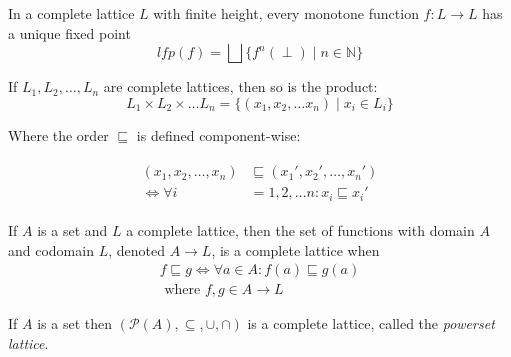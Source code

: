 

\begin{theorem}\label{thm:kleene_finite}
In a complete lattice $L$ with finite height, every monotone function $f : L \rightarrow L$ has a unique fixed point
\begin{equation}
    lfp(f) = \bigsqcup\{f^n(\perp) \mid n \in \mathbb{N}\}\label{eq:equation6}
\end{equation}
\end{theorem}


\begin{theorem}\label{thm:product-lattice}
    If $L_1, L_2, \dots, L_n$ are complete lattices, then so is the product:
    \begin{equation}
        L_1 \times L_2 \times \dots L_n = \{(x_1, x_2, \dots x_n) \mid x_i \in L_i\}\label{eq:equation7}
    \end{equation}

    Where the order $\sqsubseteq$ is defined component-wise:

    \begin{align}
        \begin{split}
        (x_1, x_2, \dots, x_n) &\sqsubseteq (x_1', x_2', \dots, x_n') \\
        \iff
        \forall i &= 1, 2, \dots n : x_i \sqsubseteq x_i'
        \end{split}
    \end{align}
\end{theorem}

\begin{theorem}
    If $A$ is a set and $L$ a complete lattice, then the set of functions with domain $A$ and codomain $L$, denoted $A \rightarrow L$, is a complete lattice when
    \begin{equation}
        \begin{split}
            f \sqsubseteq g \iff \forall a \in A : f(a) \sqsubseteq g(a) \\ \text{ where } f,g \in A \rightarrow L\label{eq:equation-complete-lattice-theorem}
        \end{split}
    \end{equation}
\end{theorem}

\begin{theorem}\label{thm:powerset}
    If $A$ is a set then $(\mathcal{P}(A), \subseteq, \cup, \cap)$ is a complete lattice, called the \emph{powerset lattice}.
\end{theorem}

